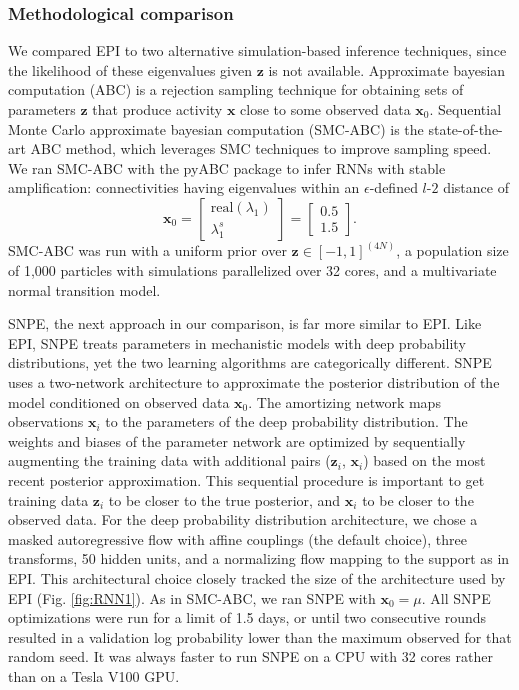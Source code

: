 \documentclass[11pt]{article}
\begin{document}
\subsubsection{Methodological comparison}
We compared EPI to two alternative simulation-based inference techniques, since the likelihood of these eigenvalues given $\mathbf{z}$ is not available.
Approximate bayesian computation (ABC) \cite{beaumont2002approximate} is a rejection sampling technique for obtaining sets of parameters $\mathbf{z}$ that produce activity $\mathbf{x}$ close to some observed data $\mathbf{x}_0$.
Sequential Monte Carlo approximate bayesian computation (SMC-ABC) is the state-of-the-art ABC method, which leverages SMC techniques to improve sampling speed.
We ran SMC-ABC with the pyABC package \cite{klinger2018pyabc} to infer RNNs with stable amplification: connectivities having eigenvalues within an $\epsilon$-defined $l$-$2$ distance of
\begin{equation}\label{eq:stab_amp_x0}
\mathbf{x}_0 = \begin{bmatrix} \text{real}(\lambda_1) \\ \lambda^s_1 \end{bmatrix} = \begin{bmatrix} 0.5 \\ 1.5 \end{bmatrix}.
\end{equation}
SMC-ABC was run with a uniform prior over $\mathbf{z} \in \left[-1, 1 \right]^{(4N)}$, a population size of 1,000 particles with simulations parallelized over 32 cores, and a multivariate normal transition model.

SNPE, the next approach in our comparison, is far more similar to EPI.
Like EPI, SNPE treats parameters in mechanistic models with deep probability distributions, yet the two learning algorithms are categorically different.
SNPE uses a two-network architecture to approximate the posterior distribution of the model conditioned on observed data $\mathbf{x}_0$.
The amortizing network maps observations $\mathbf{x}_i$ to the parameters of the deep probability distribution. 
The weights and biases of the parameter network are optimized by sequentially augmenting the training data with additional pairs ($\mathbf{z}_i$, $\mathbf{x}_i$) based on the most recent posterior approximation.
This sequential procedure is important to get training data $\mathbf{z}_i$ to be closer to the true posterior, and $\mathbf{x}_i$ to be closer to the observed data.
For the deep probability distribution architecture, we chose a masked autoregressive flow with affine couplings (the default choice), three transforms, 50 hidden units, and a normalizing flow mapping to the support as in EPI.
This architectural choice closely tracked the size of the architecture used by EPI (Fig. \ref{fig:RNN1}).
As in SMC-ABC, we ran SNPE with $\mathbf{x}_0 = \mu$.
All SNPE optimizations were run for a limit of 1.5 days, or until two consecutive rounds resulted in a validation log probability lower than the maximum observed for that random seed.
It was always faster to run SNPE on a CPU with 32 cores rather than on a Tesla V100 GPU.
\end{document}

